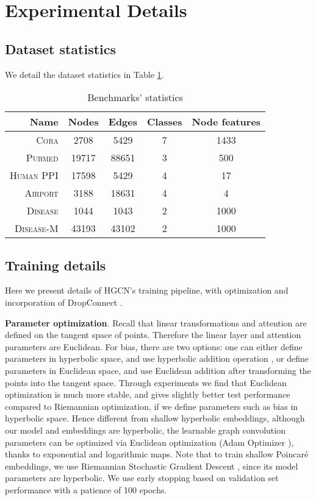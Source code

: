 \documentclass{article}
\newcommand{\xhdr}[1]{{\noindent\bfseries #1}.}
\newcommand{\name}{\textsc{HGCN}\xspace}
\begin{document}
\section{Experimental Details}
\subsection{Dataset statistics}
We detail the dataset statistics in Table \ref{table:dataset}.


\begin{table}
    \centering
	\begin{tabular}{r c c c c} 
	\hline
	Name & Nodes & Edges & Classes & Node features  \\
	\hline
	\textsc{Cora} & 2708 & 5429 & 7 & 1433 \\
	{\textsc{Pubmed}} & 19717 & 88651 & 3 & 500 \\
	{\textsc{Human PPI}} & 17598 & 5429 & 4 & 17 \\
	{\textsc{Airport}} & 3188 & 18631 & 4 & 4 \\
	{\textsc{Disease}} & 1044 & 1043 & 2 & 1000 \\
	{\textsc{Disease-M}} & 43193 & 43102 & 2 & 1000 \\
	\hline
	\end{tabular}
    \caption{Benchmarks' statistics}
    \label{table:dataset}
\end{table}

\subsection{Training details}
Here we present details of \name's training pipeline, with optimization and incorporation of DropConnect \cite{wan2013regularization}. 


\xhdr{Parameter optimization}
Recall that linear transformations and attention are defined on the tangent space of points. 
Therefore the linear layer and attention parameters are Euclidean.
For bias, there are two options: one can either define parameters in hyperbolic space, and use hyperbolic addition operation \cite{ganea2018hyperbolicNN}, or define parameters in Euclidean space, and use Euclidean addition after transforming the points into the tangent space.
Through experiments we find that Euclidean optimization is much more stable, and gives slightly better test performance compared to Riemannian optimization, if we define parameters such as bias in hyperbolic space.
Hence different from shallow hyperbolic embeddings, although our model and embeddings are hyperbolic, the learnable graph convolution parameters can be optimized via Euclidean optimization (Adam Optimizer \cite{kingma2014adam}), thanks to exponential and logarithmic maps.
Note that to train shallow Poincar\'e embeddings, we use Riemannian Stochastic Gradient Descent \cite{bonnabel2013stochastic,zhang2016riemannian}, since its model parameters are hyperbolic.
We use early stopping based on validation set performance with a patience of 100 epochs.
\end{document}
